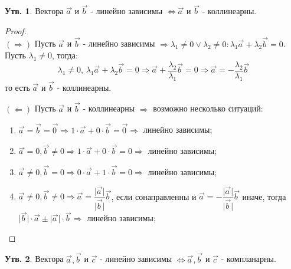 \documentclass[12pt]{article}
\theoremstyle{definition}
\newtheorem{prop}{Утв.}
\newcommand{\vecm}[1]{\overrightarrow{#1\,}}
\begin{document}
\begin{prop}
	Вектора $\vecm{a}$ и $\vecm{b}$ - линейно зависимы $\Leftrightarrow \vecm{a}$ и $\vecm{b}$ - коллинеарны.
\end{prop}
\begin{proof}\hfill\\
	$(\Rightarrow)$ Пусть $\vecm{a}$ и $\vecm{b}$ - линейно зависимы $\Rightarrow \lambda_1 \neq 0 \vee \lambda_2 \neq 0 \colon \lambda_1\vecm{a} + \lambda_2 \vecm{b} = 0$. Пусть $\lambda_1 \neq 0$, тогда: 
	$$
		\lambda_1 \neq 0, \, \lambda_1 \vecm{a} + \lambda_2 \vecm{b} = 0 \Rightarrow \vecm{a} + \dfrac{\lambda_2}{\lambda_1}\vecm{b} = 0 \Rightarrow \vecm{a} = -\dfrac{\lambda_2}{\lambda_1}\vecm{b}
	$$
	то есть $\vecm{a}$ и $\vecm{b}$ - коллинеарны.
	
	$(\Leftarrow)$ Пусть $\vecm{a}$ и $\vecm{b}$ - коллинеарны $\Rightarrow$ возможно несколько ситуаций:
	\begin{enumerate}[label=\arabic*)]
		\item $\vecm{a} = \vecm{b} = \vecm{0} \Rightarrow 1{\cdot}\vecm{a} + 0{\cdot}\vecm{b} = \vecm{0} \Rightarrow$ линейно зависимы;
		\item $\vecm{a}  = 0, \vecm{b}  \neq 0 \Rightarrow 1{\cdot}\vecm{a} + 0{\cdot}\vecm{b} = 0 \Rightarrow$ линейно зависимы; 
		\item $\vecm{a}  \neq 0, \vecm{b} = 0 \Rightarrow 0{\cdot}\vecm{a} + 1{\cdot}\vecm{b} = 0 \Rightarrow$ линейно зависимы;
		\item $\vecm{a}  \neq 0, \vecm{b} \neq 0 \Rightarrow \vecm{a} = \dfrac{\big| \vecm{a}\big|}{\big| \vecm{b}\big|}\vecm{b}$, если сонаправленны и $\vecm{a} = -\dfrac{\big| \vecm{a}\big|}{\big| \vecm{b}\big|}\vecm{b}$ иначе, тогда $\big|\vecm{b}\big|{\cdot}\vecm{a} \pm \big|\vecm{a}\big|{\cdot}\vecm{b} \Rightarrow$ линейно зависимы;
	\end{enumerate}
\end{proof}

\begin{prop}
	Вектора $\vecm{a}, \vecm{b}$ и $\vecm{c}$ - линейно зависимы $\Leftrightarrow \vecm{a}, \vecm{b}$ и $\vecm{c}$ - компланарны.
\end{prop}
\end{document}

